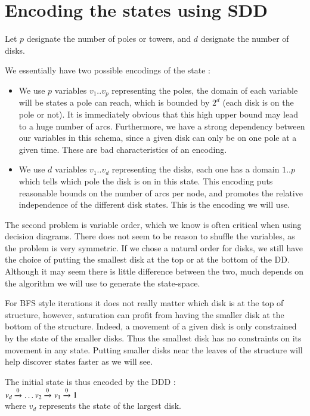 \section{Encoding the states using SDD}
\label{sec:cod}

Let $p$ designate the number of poles or towers, and $d$ designate the
number of disks.

We essentially have two possible encodings of the state :
\begin{itemize}
\item We use $p$ variables $v_1 .. v_p$ representing the poles, the domain of each
variable will be states a pole can reach, which is bounded by $2^d$
(each disk is on the pole or not). It is immediately obvious that this
high upper bound may lead to a huge number of arcs. Furthermore, we
have a strong dependency between our variables in this schema, since a
given disk can only be on one pole at a given time. These are bad
characteristics of an encoding.
\item We use $d$ variables $v_1..v_d$ representing the disks, each one has a domain
$1..p$ which tells which pole the disk is on in this state. This
encoding puts reasonable bounds on the number of arcs per node, and
promotes the relative independence of the different disk states. This
is the encoding we will use.
\end{itemize}

The second problem is variable order, which we know is often critical
when using decision diagrams. There does not seem to be reason to
shuffle the variables, as the problem is very symmetric. If we chose a
natural order for disks, we still have the choice of putting the
smallest disk at the top or at the bottom of the DD. 
Although it may seem there is little difference between the two, much
depends on the algorithm we will use to generate the state-space.

For BFS style iterations it does not really matter which disk is at
the top of structure, however, saturation can profit from having the
smaller disk at the bottom of the structure. Indeed, a movement of a
given disk is only constrained by the state of the smaller disks. Thus
the smallest disk has no constraints on its movement in any
state. Putting smaller disks near the leaves of the structure will
help discover states faster as we will see.

The initial state is thus encoded by the DDD : \\
$v_d \xrightarrow{\scriptstyle {0}} \ldots v_2 \xrightarrow{\scriptstyle {0}} v_1 \xrightarrow{\scriptstyle {0}} 1$ \\
where $v_d$ represents the state of the largest disk. 
